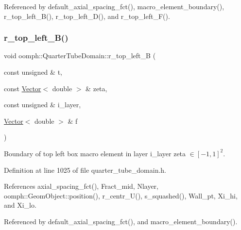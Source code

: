 Referenced by default\+\_\+axial\+\_\+spacing\+\_\+fct(), macro\+\_\+element\+\_\+boundary(), r\+\_\+top\+\_\+left\+\_\+\+B(), r\+\_\+top\+\_\+left\+\_\+\+D(), and r\+\_\+top\+\_\+left\+\_\+\+F().

\mbox{\label{classoomph_1_1QuarterTubeDomain_ab7a0b29926aff44bb26d5544c8dadfb0}} 
\subsubsection{\texorpdfstring{r\+\_\+top\+\_\+left\+\_\+\+B()}{r\_top\_left\_B()}}
{\footnotesize\ttfamily void oomph\+::\+Quarter\+Tube\+Domain\+::r\+\_\+top\+\_\+left\+\_\+B (\begin{DoxyParamCaption}\item[{const unsigned \&}]{t,  }\item[{const \hyperlink{classoomph_1_1Vector}{Vector}$<$ double $>$ \&}]{zeta,  }\item[{const unsigned \&}]{i\+\_\+layer,  }\item[{\hyperlink{classoomph_1_1Vector}{Vector}$<$ double $>$ \&}]{f }\end{DoxyParamCaption})\hspace{0.3cm}{\ttfamily [private]}}



Boundary of top left box macro element in layer i\+\_\+layer zeta $ \in [-1,1]^2 $. 



Definition at line 1025 of file quarter\+\_\+tube\+\_\+domain.\+h.



References axial\+\_\+spacing\+\_\+fct(), Fract\+\_\+mid, Nlayer, oomph\+::\+Geom\+Object\+::position(), r\+\_\+centr\+\_\+\+U(), s\+\_\+squashed(), Wall\+\_\+pt, Xi\+\_\+hi, and Xi\+\_\+lo.



Referenced by default\+\_\+axial\+\_\+spacing\+\_\+fct(), and macro\+\_\+element\+\_\+boundary().

\mbox{\label{classoomph_1_1QuarterTubeDomain_a07e5e6c5549b5cda5adbc91c8c9fdcbb}} 
